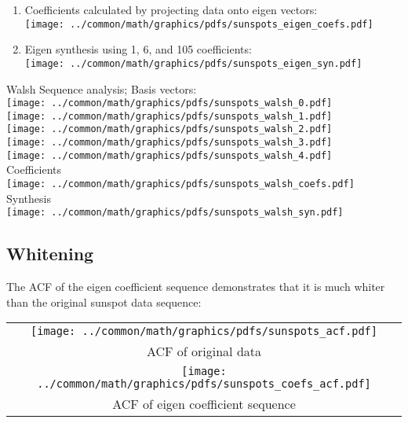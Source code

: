 \begin{example}
\begin{enumerate}
\item Coefficients calculated by projecting data onto eigen vectors:
\\\texttt{[image: ../common/math/graphics/pdfs/sunspots\_eigen\_coefs.pdf]}

\item Eigen synthesis using 1, 6, and 105 coefficients:
\\\texttt{[image: ../common/math/graphics/pdfs/sunspots\_eigen\_syn.pdf]}

\end{enumerate}
\end{example}

\begin{example}
\label{ex:sunspot_period_Walsh}
Walsh Sequence analysis;
Basis vectors:
\\\texttt{[image: ../common/math/graphics/pdfs/sunspots\_walsh\_0.pdf]}
\\\texttt{[image: ../common/math/graphics/pdfs/sunspots\_walsh\_1.pdf]}
\\\texttt{[image: ../common/math/graphics/pdfs/sunspots\_walsh\_2.pdf]}
\\\texttt{[image: ../common/math/graphics/pdfs/sunspots\_walsh\_3.pdf]}
\\\texttt{[image: ../common/math/graphics/pdfs/sunspots\_walsh\_4.pdf]}
\\Coefficients
\\\texttt{[image: ../common/math/graphics/pdfs/sunspots\_walsh\_coefs.pdf]}
\\Synthesis
\\\texttt{[image: ../common/math/graphics/pdfs/sunspots\_walsh\_syn.pdf]}
\end{example}

\subsection{Whitening}
\begin{example}
\label{ex:sunspot_period_Walsh}
The ACF of the eigen coefficient sequence demonstrates that
      it is much whiter than the original sunspot data sequence:
\\\begin{tabular}{|c|}
  \hline
  \texttt{[image: ../common/math/graphics/pdfs/sunspots\_acf.pdf]}
  \\ACF of original data
  \\\hline
  \texttt{[image: ../common/math/graphics/pdfs/sunspots\_coefs\_acf.pdf]}
  \\ACF of eigen coefficient sequence
  \\\hline
\end{tabular}
\end{example}
